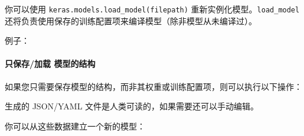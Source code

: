 你可以使用 \texttt{keras.models.load\_model(filepath)}
重新实例化模型。\texttt{load\_model}
还将负责使用保存的训练配置项来编译模型（除非模型从未编译过）。

例子：

\begin{Shaded}
\begin{Highlighting}[]
  

\NormalTok{)  }
 

\OperatorTok{=} \NormalTok{)}
\end{Highlighting}
\end{Shaded}

\paragraph{只保存/加载
模型的结构}\label{ux53eaux4fddux5b58ux52a0ux8f7d-ux6a21ux578bux7684ux7ed3ux6784}

如果您只需要保存模型的结构，而非其权重或训练配置项，则可以执行以下操作：

\begin{Shaded}
\begin{Highlighting}[]
\OperatorTok{=} 

\OperatorTok{=} 
\end{Highlighting}
\end{Shaded}

生成的 JSON/YAML 文件是人类可读的，如果需要还可以手动编辑。

你可以从这些数据建立一个新的模型：

\begin{Shaded}
\begin{Highlighting}[]
  
\OperatorTok{=} 

  
\OperatorTok{=} 
\end{Highlighting}
\end{Shaded}

